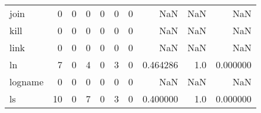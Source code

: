 \begin{longtable}{lrrrrrrrrr}
join      &                                                  0 &                                                  0 &                                                  0 &                                                  0 &                                                  0 &                                                  0 &                                                NaN &                                    NaN &                                  NaN \\
kill      &                                                  0 &                                                  0 &                                                  0 &                                                  0 &                                                  0 &                                                  0 &                                                NaN &                                    NaN &                                  NaN \\
link      &                                                  0 &                                                  0 &                                                  0 &                                                  0 &                                                  0 &                                                  0 &                                                NaN &                                    NaN &                                  NaN \\
ln        &                                                  7 &                                                  0 &                                                  4 &                                                  0 &                                                  3 &                                                  0 &                                           0.464286 &                                    1.0 &                             0.000000 \\
logname   &                                                  0 &                                                  0 &                                                  0 &                                                  0 &                                                  0 &                                                  0 &                                                NaN &                                    NaN &                                  NaN \\
ls        &                                                 10 &                                                  0 &                                                  7 &                                                  0 &                                                  3 &                                                  0 &                                           0.400000 &                                    1.0 &                             0.000000 \\

\end{longtable}
